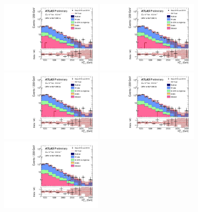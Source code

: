 \clearpage
\begin{figure}[tbph]
\begin{center}
\includegraphics[width=0.45\textwidth]{figures/ATLAS-CONF-2016-078_INT/N-1Plots/AtlasStyle/Preliminary/CRW_SRJigsawSRG1a_LastCut_CRW_minusone}
\includegraphics[width=0.45\textwidth]{figures/ATLAS-CONF-2016-078_INT/N-1Plots/AtlasStyle/Preliminary/CRW_SRJigsawSRG1b_LastCut_CRW_minusone}
\includegraphics[width=0.45\textwidth]{figures/ATLAS-CONF-2016-078_INT/N-1Plots/AtlasStyle/Preliminary/CRW_SRJigsawSRG2a_LastCut_CRW_minusone}
\includegraphics[width=0.45\textwidth]{figures/ATLAS-CONF-2016-078_INT/N-1Plots/AtlasStyle/Preliminary/CRW_SRJigsawSRG2b_LastCut_CRW_minusone}
\includegraphics[width=0.45\textwidth]{figures/ATLAS-CONF-2016-078_INT/N-1Plots/AtlasStyle/Preliminary/CRW_SRJigsawSRG3a_LastCut_CRW_minusone}

\end{center}
\end{figure}
